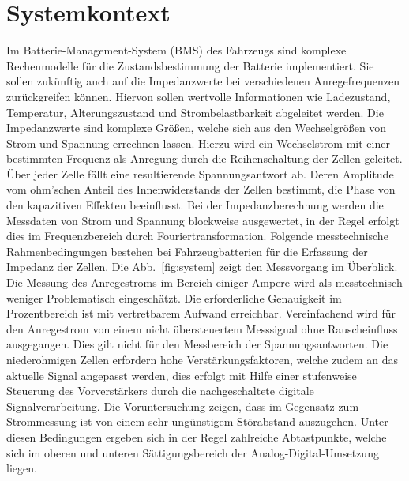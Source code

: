 \section{Systemkontext}
Im Batterie-Management-System (BMS)  des Fahrzeugs sind komplexe Rechenmodelle für die Zustandsbestimmung der Batterie implementiert. Sie sollen zukünftig auch auf die Impedanzwerte bei verschiedenen Anregefrequenzen zurückgreifen können. Hiervon sollen wertvolle Informationen wie Ladezustand, Temperatur, Alterungszustand und Strombelastbarkeit abgeleitet werden. Die Impedanzwerte sind komplexe Größen, welche sich aus den Wechselgrößen von Strom und Spannung errechnen lassen. Hierzu wird ein Wechselstrom mit einer bestimmten Frequenz als Anregung durch die Reihenschaltung der Zellen geleitet. Über jeder Zelle fällt eine resultierende Spannungsantwort ab. Deren Amplitude vom ohm'schen Anteil des Innenwiderstands der Zellen bestimmt, die Phase von den kapazitiven Effekten beeinflusst.
Bei der Impedanzberechnung werden die Messdaten von Strom und Spannung blockweise ausgewertet, in der Regel erfolgt dies im Frequenzbereich durch Fouriertransformation. Folgende messtechnische Rahmenbedingungen bestehen bei Fahrzeugbatterien für die Erfassung der Impedanz der Zellen. Die Abb.~\ref{fig:system} zeigt den Messvorgang im Überblick. Die Messung des Anregestroms im Bereich einiger Ampere wird als messtechnisch weniger Problematisch eingeschätzt. Die erforderliche Genauigkeit im Prozentbereich ist mit vertretbarem Aufwand erreichbar. Vereinfachend wird für den Anregestrom von einem nicht übersteuertem Messsignal ohne Rauscheinfluss ausgegangen. Dies gilt nicht für den Messbereich der Spannungsantworten. Die niederohmigen Zellen erfordern hohe Verstärkungsfaktoren, welche zudem an das aktuelle Signal angepasst werden, dies erfolgt mit Hilfe einer stufenweise Steuerung des Vorverstärkers durch die nachgeschaltete digitale Signalverarbeitung. Die Voruntersuchung zeigen, dass im Gegensatz zum Strommessung ist von einem sehr ungünstigem Störabstand auszugehen. Unter diesen Bedingungen ergeben sich in der Regel zahlreiche Abtastpunkte, welche sich im oberen und unteren Sättigungsbereich der Analog-Digital-Umsetzung liegen.

